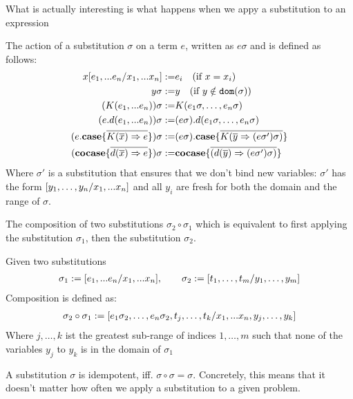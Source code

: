 \documentclass[twoside,12pt,a4paper]{article}
\begin{document}
What is actually interesting is what happens when we appy a substitution to an expression

\begin{definition}
    The action of a substitution $\sigma$ on a term $e$, written as $e \sigma$ and is defined as follows:
    \begin{align*}
        x[e_1,...e_n / x_1,...x_n] :=& e_i \quad(\text{if } x=x_i) \\
        y\sigma :=& y\quad (\text{if }y\notin \texttt{dom}(\sigma))\\
        (K(e_1,...e_n))\sigma :=& K(e_1 \sigma,\dots , e_n \sigma)\\
        (e.d(e_1,...e_n)) \sigma:=& (e \sigma).d(e_1 \sigma,\dots , e_n \sigma)\\
        (e.\textbf{case}\{\overline{K(\overline{x})\Rightarrow e}\})\sigma:=& (e\sigma).\textbf{case}\{\overline{K(\overline{y}\Rightarrow (e\sigma')\sigma)}\}\\
        (\textbf{cocase}\{\overline{d(\overline{x})\Rightarrow e}\})\sigma:=& \textbf{cocase}\{\overline{(d(\overline{y})\Rightarrow(e\sigma')\sigma)}\}
    \end{align*} 
    Where $\sigma'$ is a substitution that ensures that we don't bind new variables: 
    $\sigma'$ has the form $[y_1,\dots, y_n/x_1,...x_n]$ and all $y_i$ are fresh for both the domain and the range of $\sigma$.
\end{definition}

The composition of two substitutions $\sigma_2 \circ \sigma_1$ which is equivalent to first applying the substitution $\sigma_1$, then the substitution $\sigma_2$.

\begin{definition}
    Given two substitutions
    \begin{align*}
        \sigma_1 := [e_1,...e_n/x_1,...x_n],\qquad \sigma_2 := [t_1,\dots,t_m/y_1,\dots,y_m]
    \end{align*}
    Composition is defined as:
    \begin{align*}
        \sigma_2\circ\sigma_1 := [e_1\sigma_2,\dots,e_n\sigma_2,t_j,\dots,t_k/x_1,...x_n,y_j,\dots,y_k]
    \end{align*}
    Where $j, \dots, k$ ist the greatest sub-range of indices $1,\dots,m$ such that none of the variables $y_j$ to $y_k$ is in the domain of $\sigma_1$ 
\end{definition}

\begin{definition}[Idempotency]
    A substitution $\sigma$ is idempotent, iff. $\sigma \circ \sigma = \sigma$.
    Concretely, this means that it doesn't matter how often we apply a substitution to a given problem.
\end{definition}
\end{document}
